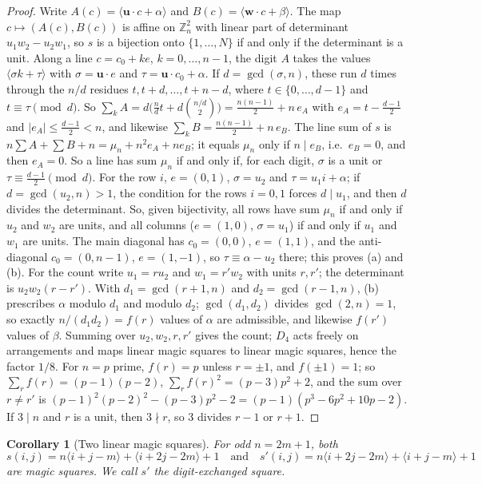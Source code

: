 \documentclass[11pt,a4paper]{article}
\theoremstyle{plain}
\newtheorem{corollary}[theorem]{Corollary}
\theoremstyle{definition}
\theoremstyle{remark}
\newcommand{\Z}{\mathbb{Z}}
\begin{document}
\begin{proof}
Write $A(c)=\langle\mathbf u\cdot c+\alpha\rangle$ and $B(c)=\langle\mathbf w\cdot c+\beta\rangle$.
The map $c\mapsto(A(c),B(c))$ is affine on $\Z_n^2$ with linear part of determinant $u_1w_2-u_2w_1$, so $s$ is a bijection onto $\{1,\dots,N\}$ if and only if the determinant is a unit.
Along a line $c=c_0+ke$, $k=0,\dots,n-1$, the digit $A$ takes the values $\langle\sigma k+\tau\rangle$ with $\sigma=\mathbf u\cdot e$ and $\tau=\mathbf u\cdot c_0+\alpha$.
If $d=\gcd(\sigma,n)$, these run $d$ times through the $n/d$ residues $t,t+d,\dots,t+n-d$, where $t\in\{0,\dots,d-1\}$ and $t\equiv\tau\pmod d$.
So $\sum_kA=d\bigl(\frac ndt+d\binom{n/d}2\bigr)=\frac{n(n-1)}2+n\,e_A$ with $e_A=t-\frac{d-1}2$ and $|e_A|\le\frac{d-1}2<n$, and likewise $\sum_kB=\frac{n(n-1)}2+n\,e_B$.
The line sum of $s$ is $n\sum A+\sum B+n=\mu_n+n^2e_A+ne_B$; it equals $\mu_n$ only if $n\mid e_B$, i.e.\ $e_B=0$, and then $e_A=0$.
So a line has sum $\mu_n$ if and only if, for each digit, $\sigma$ is a unit or $\tau\equiv\frac{d-1}2\pmod d$.
For the row $i$, $e=(0,1)$, $\sigma=u_2$ and $\tau=u_1i+\alpha$; if $d=\gcd(u_2,n)>1$, the condition for the rows $i=0,1$ forces $d\mid u_1$, and then $d$ divides the determinant.
So, given bijectivity, all rows have sum $\mu_n$ if and only if $u_2$ and $w_2$ are units, and all columns ($e=(1,0)$, $\sigma=u_1$) if and only if $u_1$ and $w_1$ are units.
The main diagonal has $c_0=(0,0)$, $e=(1,1)$, and the anti-diagonal $c_0=(0,n-1)$, $e=(1,-1)$, so $\tau\equiv\alpha-u_2$ there; this proves (a) and (b).
For the count write $u_1=ru_2$ and $w_1=r'w_2$ with units $r,r'$; the determinant is $u_2w_2(r-r')$.
With $d_1=\gcd(r+1,n)$ and $d_2=\gcd(r-1,n)$, (b) prescribes $\alpha$ modulo $d_1$ and modulo $d_2$; $\gcd(d_1,d_2)$ divides $\gcd(2,n)=1$, so exactly $n/(d_1d_2)=f(r)$ values of $\alpha$ are admissible, and likewise $f(r')$ values of $\beta$.
Summing over $u_2,w_2,r,r'$ gives the count; $D_4$ acts freely on arrangements and maps linear magic squares to linear magic squares, hence the factor $1/8$.
For $n=p$ prime, $f(r)=p$ unless $r=\pm1$, and $f(\pm1)=1$; so $\sum_rf(r)=(p-1)(p-2)$, $\sum_rf(r)^2=(p-3)p^2+2$, and the sum over $r\ne r'$ is $(p-1)^2(p-2)^2-(p-3)p^2-2=(p-1)(p^3-6p^2+10p-2)$.
If $3\mid n$ and $r$ is a unit, then $3\nmid r$, so $3$ divides $r-1$ or $r+1$.
\end{proof}

\begin{corollary}[Two linear magic squares]
\label{cor:two-linear}
For odd $n=2m+1$, both
\[
s(i,j)=n\langle i+j-m\rangle+\langle i+2j-2m\rangle+1
\quad\text{and}\quad
s'(i,j)=n\langle i+2j-2m\rangle+\langle i+j-m\rangle+1
\]
are magic squares. We call $s'$ the \emph{digit-exchanged square}.
\end{corollary}
\end{document}

